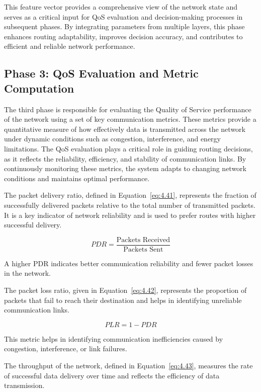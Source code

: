 \documentclass[a4paper,fleqn]{cas-dc}
\numberwithin{equation}{section}
\begin{document}
This feature vector provides a comprehensive view of the network state and serves as a critical input for QoS evaluation and decision-making processes in subsequent phases. By integrating parameters from multiple layers, this phase enhances routing adaptability, improves decision accuracy, and contributes to efficient and reliable network performance.
\subsection{Phase 3: QoS Evaluation and Metric Computation}

The third phase is responsible for evaluating the Quality of Service performance of the network using a set of key communication metrics. These metrics provide a quantitative measure of how effectively data is transmitted across the network under dynamic conditions such as congestion, interference, and energy limitations. The QoS evaluation plays a critical role in guiding routing decisions, as it reflects the reliability, efficiency, and stability of communication links. By continuously monitoring these metrics, the system adapts to changing network conditions and maintains optimal performance.

The packet delivery ratio, defined in Equation~\ref{eq:4.41}, represents the fraction of successfully delivered packets relative to the total number of transmitted packets. It is a key indicator of network reliability and is used to prefer routes with higher successful delivery.

\begin{equation}
PDR = \frac{\text{Packets Received}}{\text{Packets Sent}}
\label{eq:4.41}
\end{equation}

A higher PDR indicates better communication reliability and fewer packet losses in the network.

The packet loss ratio, given in Equation~\ref{eq:4.42}, represents the proportion of packets that fail to reach their destination and helps in identifying unreliable communication links.

\begin{equation}
PLR = 1 - PDR
\label{eq:4.42}
\end{equation}

This metric helps in identifying communication inefficiencies caused by congestion, interference, or link failures.

The throughput of the network, defined in Equation~\ref{eq:4.43}, measures the rate of successful data delivery over time and reflects the efficiency of data transmission.
\end{document}
